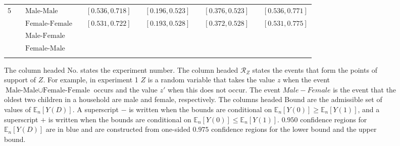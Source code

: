 \documentclass[10pt,a4paper,twoside]{article}
\numberwithin{equation}{section}
\begin{document}
\begin{sidewaystable}[p]
\begin{subfigure}{\textwidth}
\begin{tabular}{lclcrcrcrcr}
5 & &$\text{Male-Male}$&	&	$[0.536,0.718]$	&	&	$[0.196,0.523]$	&	&	$[0.376,0.523]$	&	&	$[0.536,0.771]$
\\
& &$\text{Female-Female}$& &\color{blue}$[0.531,0.722]$	&	&	\color{blue}$[0.193,0.528]$	&	&	\color{blue}$[0.372,0.528]$	&	&	\color{blue}$[0.531,0.775]$\\
& &$\text{Male-Female}$ \\
& &$\text{Female-Male}$\\	
	\\
\bottomrule
\end{tabular}
\vspace{10pt}
\caption{The column headed No. states the experiment number. The column headed $\mathcal{R}_Z$ states the events that form the points of support of $Z$. For example, in experiment 1 $Z$ is a random variable that takes the value $z$ when the event $\text{Male-Male}\cup\text{Female-Female}$ occurs and the value $z'$ when this does not occur. The event $Male-Female$ is the event that the oldest two children in a household are male and female, respectively. The columns headed Bound are the admissible set of values of $\mathbb{E}_n[Y(D)]$. A superscript $-$ is written when the bounds are conditional on $\mathbb{E}_n[Y(0)]\geq\mathbb{E}_n[Y(1)]$, and a superscript $+$ is written when the bounds are conditional on $\mathbb{E}_n[Y(0)]\leq\mathbb{E}_n[Y(1)]$. $0.950$ confidence regions for $\mathbb{E}_n[Y(D)]$ are in blue and are constructed from one-sided $0.975$ confidence regions for the lower bound and the upper bound.}
\end{subfigure}
\label{tbl:setssame}
\end{sidewaystable}
\end{document}
